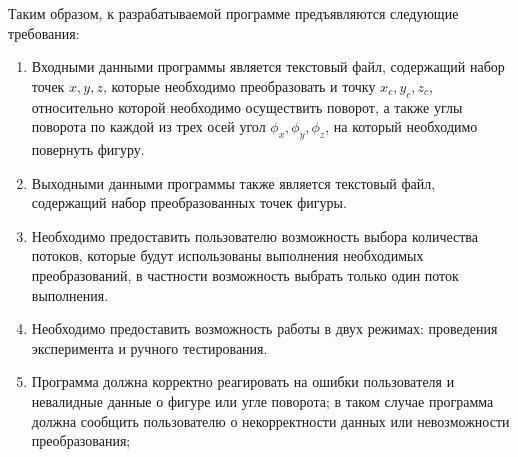 Таким образом, к разрабатываемой программе предъявляются следующие требования:
\begin{enumerate}
	\item Входными данными программы является текстовый файл, содержащий набор точек $x, y, z$, 
	которые необходимо преобразовать и точку $x_{c}, y_{c}, z_{c}$, относительно которой 
	необходимо осуществить поворот, а также углы поворота по каждой из трех осей угол $\phi_{x}, \phi_{y}, \phi_{z}$, на который необходимо повернуть фигуру.
	\item Выходными данными программы также является текстовый файл, содержащий набор преобразованных точек фигуры.
	\item Необходимо предоставить пользователю возможность выбора количества потоков, 
	которые будут использованы выполнения необходимых преобразований, в частности возможность 
	выбрать только один поток выполнения.
	\item Необходимо предоставить возможность работы в двух режимах: проведения эксперимента и ручного тестирования.
	\item Программа должна корректно реагировать на ошибки пользова­теля и невалидные данные
	о фигуре или угле поворота; в таком случае программа должна сообщить пользователю о некорректности
	данных или невозможности преобразования;
\end{enumerate}


